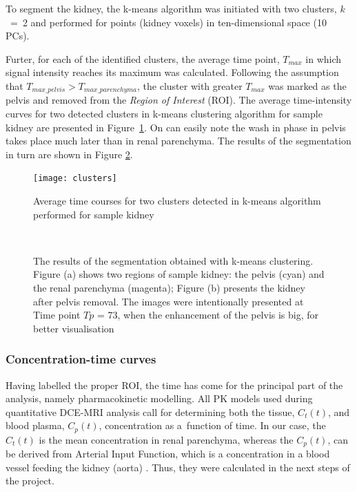 \vspace{16pt}
To segment the kidney, the k-means algorithm was initiated with two clusters, $k$~=~2 and performed for points (kidney voxels) in ten-dimensional space (10 PCs).

Furter, for each of the identified clusters, the average time point, $T_{max}$ in which signal intensity reaches its maximum was calculated. 
Following the assumption that $T_{max\_pelvis}>T_{max\_parenchyma}$, the cluster with greater $T_{max}$ was marked as the pelvis and removed from the \textit{Region of Interest} (ROI).
The average time-intensity curves for two detected clusters in k-means clustering algorithm for sample kidney are presented in Figure~\ref{fig:clusters}. On can easily note the wash in phase in pelvis takes place much later than in renal parenchyma. The results of the segmentation in turn are shown in Figure \ref{fig:segmentation}.  


\begin{figure}[H]
	\centering
	\texttt{[image: clusters]}
	
\caption[Average time courses for two clusters detected in k-means algorithm]{Average time courses for two clusters detected in k-means algorithm performed for sample kidney}
\label{fig:clusters}
\end{figure}

\begin{figure}[H]
\captionsetup[subfloat]{captionskip=0.5cm}
	\centering
	\hspace{0.02\textwidth}
	\\	
\vspace{0.5cm}
\caption[Sample kidney segmentation with k-means clustering]{The results of the segmentation obtained with k-means clustering. Figure (a) shows two regions of sample kidney: the pelvis (cyan) and the renal parenchyma (magenta); Figure (b) presents the kidney after pelvis removal. The images were intentionally presented at Time point $Tp$ = 73, when the enhancement of the pelvis is big, for better visualisation}
\label{fig:segmentation}
\end{figure}

\subsubsection{Concentration-time curves}
Having labelled the proper ROI, the time has come for the principal part of the analysis, namely pharmacokinetic modelling.
All PK models used during quantitative DCE-MRI analysis call for determining both the tissue, $C_t(t)$, and blood plasma, $C_p(t)$, concentration as a~function of time. In our case, the $C_t(t)$ is the mean concentration in renal parenchyma, whereas the
$C_p(t)$, can be derived from  Arterial Input Function, which is a concentration in a blood vessel feeding the kidney (aorta) \cite{khalifa2014models}. 
Thus, they were calculated in the next steps of the project.  

